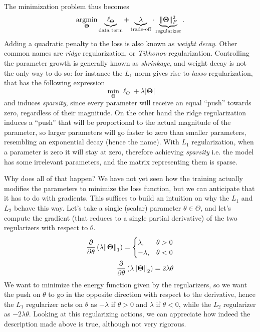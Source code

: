The minimization problem thus becomes
\begin{equation}
	\operatorname*{\operatorname{argmin}}_\mathbf{\Theta} \underbrace{\ell_\Theta}_\text{data term} + \underbrace{\lambda}_\text{trade-off} \cdot \underbrace{\| \mathbf{\Theta} \|^2_F}_\text{regularizer}.
\end{equation}
Adding a quadratic penalty to the loss is also known as \emph{weight decay}. Other common names are \emph{ridge} regularization, or \emph{Tikhonov} regularization. Controlling the parameter growth is generally known as \emph{shrinkage}, and weight decay is not the only way to do so: for instance the $L_1$ norm gives rise to \emph{lasso} regularization, that has the following expression
\begin{equation}
	\min_\mathbf{\Theta} \ell_\Theta + \lambda| \mathbf{\Theta} |
\end{equation}
and induces \emph{sparsity}, since every parameter will receive an equal ``push'' towards zero, regardless of their magnitude. On the other hand the ridge regularization induces a ``push'' that will be proportional to the actual magnitude of the parameter, so larger parameters will go faster to zero than smaller parameters, resembling an exponential decay (hence the name). With $L_1$ regularization, when a parameter is zero it will stay at zero, therefore achieving \emph{sparsity} i.e. the model has some irrelevant parameters, and the matrix representing them is sparse. 

Why does all of that happen? We have not yet seen how the training actually modifies the parameters to minimize the loss function, but we can anticipate that it has to do with gradients. This suffices to build an intuition on why the $L_1$ and $L_2$ behave this way. Let's take a single (scalar) parameter $\theta \in \Theta$, and let's compute the gradient (that reduces to a single partial derivative) of the two regularizers with respect to $\theta$.
\begin{align}
    \pdv{\theta}\left(\lambda \norm{\mathbf{\Theta}}_1 \right) = \begin{cases}
        \lambda, & \theta > 0 \\
        - \lambda, & \theta < 0
    \end{cases} \\
    \pdv{\theta} \left( \lambda \norm{\mathbf{\Theta}}_2 \right)= 2 \lambda \theta
\end{align}
We want to minimize the energy function given by the regularizers, so we want the push on $\theta$ to go in the opposite direction with respect to the derivative, hence the $L_1$ regularizer acts on $\theta$ as $-\lambda$ if $\theta > 0$ and $\lambda$ if $\theta < 0$, while the $L_2$ regularizer as $-2\lambda \theta$. Looking at this regularizing actions, we can appreciate how indeed the description made above is true, although not very rigorous.

